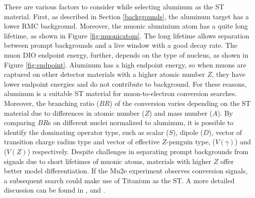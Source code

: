 There are various factors to consider while selecting aluminum as the ST material. 
First, as described in Section \ref{backgrounds}, the aluminum 
target has a lower RMC background. Moreover, the muonic aluminium 
atom has a quite long lifetime, as shown in Figure \ref{fig:muonicatom}. 
The long lifetime allows separation between prompt backgrounds and a 
live window with a good decay rate. The muon DIO endpoint energy, 
further, depends on the type of nucleus, as shown in Figure \ref{fig:endpoint}. 
Aluminum has a high endpoint energy, so when muons are captured on other 
detector materials with a higher atomic number $Z$, they have lower 
endpoint energies and do not contribute to background. For these reasons, aluminum is a 
suitable ST material for muon-to-electron conversion searches.
Moreover, the branching ratio ($BR$) of the conversion varies 
depending on the ST material due to differences in atomic number 
($Z$) and mass number ($A$). By comparing $BR$s on different nuclei 
normalized to aluminum, it is possible to identify the dominating 
operator type, such as scalar ($S$), dipole ($D$), vector of 
transition charge radius type and vector of effective $Z$-penguin type, 
($V(\gamma)$) and ($V(Z)$) respectively. 
Despite challenges in separating prompt backgrounds from 
signals due to short lifetimes of muonic atoms, 
materials with higher $Z$ offer better model differentiation. 
If the Mu2e experiment observes conversion signals, a subsequent search 
could make use of Titanium as the ST. A more detailed discussion can be 
found in \cite{PhysRevD.80.013002}, \cite{PhysRevD.76.059902} and 
\cite{abusalma2018expression}.


